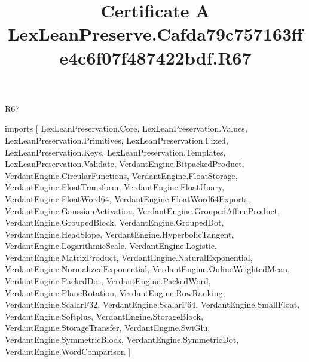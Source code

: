 \begin{lexlean}{R67}
\title{Certificate A LexLeanPreserve.Cafda79c757163ffe4c6f07f487422bdf.R67}
\begin{coremodule}
imports [
  LexLeanPreservation.Core,
  LexLeanPreservation.Values,
  LexLeanPreservation.Primitives,
  LexLeanPreservation.Fixed,
  LexLeanPreservation.Keys,
  LexLeanPreservation.Templates,
  LexLeanPreservation.Validate,
  VerdantEngine.BitpackedProduct,
  VerdantEngine.CircularFunctions,
  VerdantEngine.FloatStorage,
  VerdantEngine.FloatTransform,
  VerdantEngine.FloatUnary,
  VerdantEngine.FloatWord64,
  VerdantEngine.FloatWord64Exports,
  VerdantEngine.GaussianActivation,
  VerdantEngine.GroupedAffineProduct,
  VerdantEngine.GroupedBlock,
  VerdantEngine.GroupedDot,
  VerdantEngine.HeadSlope,
  VerdantEngine.HyperbolicTangent,
  VerdantEngine.LogarithmicScale,
  VerdantEngine.Logistic,
  VerdantEngine.MatrixProduct,
  VerdantEngine.NaturalExponential,
  VerdantEngine.NormalizedExponential,
  VerdantEngine.OnlineWeightedMean,
  VerdantEngine.PackedDot,
  VerdantEngine.PackedWord,
  VerdantEngine.PlaneRotation,
  VerdantEngine.RowRanking,
  VerdantEngine.ScalarF32,
  VerdantEngine.ScalarF64,
  VerdantEngine.SmallFloat,
  VerdantEngine.Softplus,
  VerdantEngine.StorageBlock,
  VerdantEngine.StorageTransfer,
  VerdantEngine.SwiGlu,
  VerdantEngine.SymmetricBlock,
  VerdantEngine.SymmetricDot,
  VerdantEngine.WordComparison
]


\end{coremodule}
\end{lexlean}
